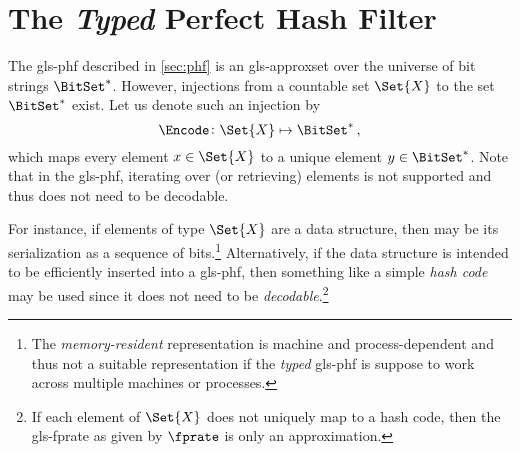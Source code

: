 \documentclass[ ../main.tex]{subfiles}
\begin{document}
\section{The \emph{Typed} Perfect Hash Filter}
The \gls{gls-phf} described in \cref{sec:phf} is an \gls{gls-approxset} over the universe of bit strings $\BitSet^*$. However, injections from a countable set $\Set{X}$ to the set $\BitSet^*$ exist. Let us denote such an injection by
\begin{equation}
    \Encode \colon \Set{X} \mapsto \BitSet^*\,,
\end{equation}
which maps every element $x \in \Set{X}$ to a unique element $y \in \BitSet^*$. Note that in the \gls{gls-phf}, iterating over (or retrieving) elements is not supported and thus \Encode does not need to be decodable.

For instance, if elements of type $\Set{X}$ are a data structure, then \Encode may be its serialization as a sequence of bits.\footnote{The \emph{memory-resident} representation is machine and process-dependent and thus not a suitable representation if the \emph{typed} \gls{gls-phf} is suppose to work across multiple machines or processes.} Alternatively, if the data structure is intended to be efficiently inserted into a \gls{gls-phf}, then something like a simple \emph{hash code} may be used since it does not need to be \emph{decodable}.\footnote{If each element of $\Set{X}$ does not uniquely map to a hash code, then the \gls{gls-fprate} as given by $\fprate$ is only an approximation.}
\end{document}
